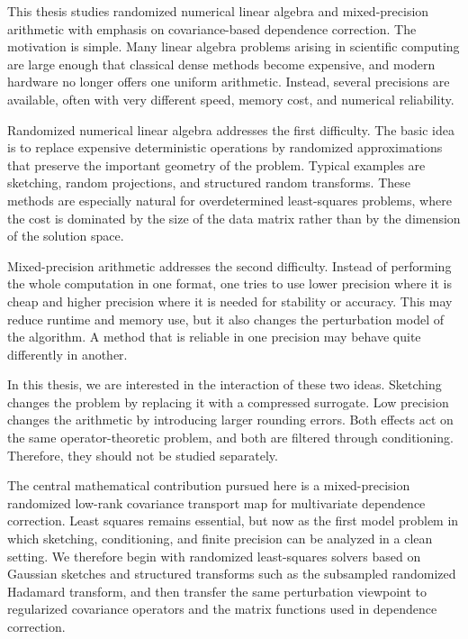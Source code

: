  \label{ch:Introduction}

This thesis studies randomized numerical linear algebra and mixed-precision
arithmetic with emphasis on covariance-based dependence correction. The
motivation is simple. Many linear algebra problems arising in scientific computing
are large enough that classical dense methods become expensive, and modern
hardware no longer offers one uniform arithmetic. Instead, several precisions are
available, often with very different speed, memory cost, and numerical
reliability.

Randomized numerical linear algebra addresses the first difficulty. The basic idea
is to replace expensive deterministic operations by randomized approximations
that preserve the important geometry of the problem. Typical examples are
sketching, random projections, and structured random transforms. These methods
are especially natural for overdetermined least-squares problems, where the cost
is dominated by the size of the data matrix rather than by the dimension of the
solution space.

Mixed-precision arithmetic addresses the second difficulty. Instead of performing
the whole computation in one format, one tries to use lower precision where it is
cheap and higher precision where it is needed for stability or accuracy. This may
reduce runtime and memory use, but it also changes the perturbation model of the
algorithm. A method that is reliable in one precision may behave quite differently
in another.

In this thesis, we are interested in the interaction of these two ideas. Sketching
changes the problem by replacing it with a compressed surrogate. Low precision
changes the arithmetic by introducing larger rounding errors. Both effects act on
the same operator-theoretic problem, and both are filtered through conditioning.
Therefore, they should not be studied separately.

The central mathematical contribution pursued here is a mixed-precision
randomized low-rank covariance transport map for multivariate dependence
correction. Least squares remains essential, but now as the first model problem in
which sketching, conditioning, and finite precision can be analyzed in a clean
setting. We therefore begin with randomized least-squares solvers based on
Gaussian sketches and structured transforms such as the subsampled randomized
Hadamard transform, and then transfer the same perturbation viewpoint to
regularized covariance operators and the matrix functions used in dependence
correction.

